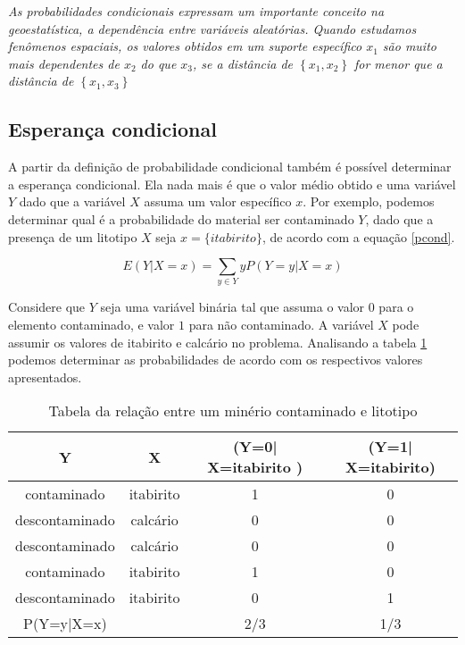 \begin{proposition}
	\textit{As probabilidades condicionais expressam um importante conceito na geoestatística, a dependência entre variáveis aleatórias. Quando estudamos fenômenos espaciais, os valores obtidos em um suporte específico $x_{1}$ são muito mais dependentes de $x_{2}$ do que $x_{3}$, se a distância de $\left\{ x_{1},x_{2} \right\}$ for menor que a distância de $\left\{ x_{1},x_{3} \right\} $} 
\end{proposition}

\subsection{Esperança condicional}

A partir da definição de probabilidade condicional também é possível determinar a esperança condicional. Ela nada mais é que o valor médio obtido e uma variável $Y$ dado que a variável $X$ assuma um valor específico $x$. Por exemplo, podemos determinar qual é a probabilidade do material ser contaminado $Y$, dado que a presença de um litotipo $X$ seja $x =\{itabirito\}$, de acordo com a equação \eqref{pcond}.  

\begin{equation}\label{pcond}
E(Y|X=x) = \sum_{y \in Y} y P(Y =y|X=x)
\end{equation}

Considere que $Y$ seja uma variável binária tal que assuma o valor $0$ para o elemento contaminado, e valor $1$ para não contaminado. A variável $X$ pode assumir os valores de itabirito e calcário no problema. Analisando a tabela \ref{tabela_condic} podemos determinar as probabilidades de acordo com os respectivos valores apresentados. 


\FloatBarrier
\begin{table}[!htpb]
	\centering
	\caption{Tabela da relação entre um minério contaminado e litotipo}
	\label{tabela_condic}
	\begin{tabular}{cccc}
		\toprule
		Y & X & (Y=0| X=itabirito ) & (Y=1| X=itabirito)  \\ \midrule
		contaminado         & itabirito    & 1    &0                                                       \\
		descontaminado     & calcário     & 0    &0                                                       \\
		descontaminado     & calcário     & 0    &0                                                       \\
		contaminado         & itabirito    & 1    &0                                                       \\
		descontaminado     & itabirito    & 0    &1                                                       \\ \bottomrule
		P(Y=y|X=x) 		&              &2/3   &1/3													   \\ \bottomrule
	\end{tabular}
\end{table} 
\FloatBarrier


